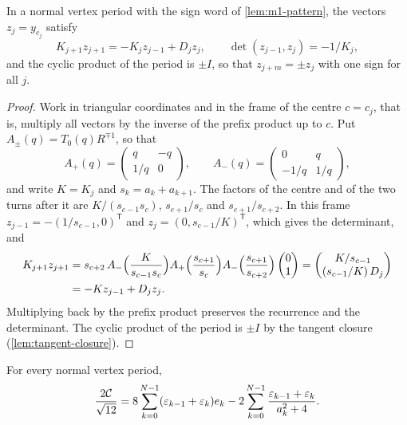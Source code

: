 \begin{lemma}\label{lem:m1-recurrence}
  In a normal vertex period with the sign word of \cref{lem:m1-pattern}, the vectors $z_j=y_{c_j}$
  satisfy
  \[
    K_{j+1}z_{j+1}=-K_jz_{j-1}+D_jz_j,\qquad \det(z_{j-1},z_j)=-1/K_j,
  \]
  and the cyclic product of the period is $\pm I$, so that $z_{j+m}=\pm z_j$ with one sign for all
  $j$.
\end{lemma}

\begin{proof}
  Work in triangular coordinates and in the frame of the centre $c=c_j$, that is, multiply all
  vectors by the inverse of the prefix product up to $c$. Put $A_\pm(q)=T_0(q)R^{\mp1}$, so that
  \[
    A_+(q)=\begin{pmatrix}q&-q\\ 1/q&0\end{pmatrix},\qquad
    A_-(q)=\begin{pmatrix}0&q\\ -1/q&1/q\end{pmatrix},
  \]
  and write $K=K_j$ and $s_k=a_k+a_{k+1}$. The factors of the centre and of the two turns after it
  are $K/(s_{c-1}s_c)$, $s_{c+1}/s_c$ and $s_{c+1}/s_{c+2}$. In this frame
  $z_{j-1}=-(1/s_{c-1},0)^{\mathsf T}$ and $z_j=(0,s_{c-1}/K)^{\mathsf T}$, which gives the
  determinant, and
  \begin{align*}
    K_{j+1}z_{j+1}
    &=s_{c+2}\,A_-\Bigl(\frac K{s_{c-1}s_c}\Bigr)A_+\Bigl(\frac{s_{c+1}}{s_c}\Bigr)
      A_-\Bigl(\frac{s_{c+1}}{s_{c+2}}\Bigr)\begin{pmatrix}0\\1\end{pmatrix}
    =\begin{pmatrix}K/s_{c-1}\\ (s_{c-1}/K)\,D_j\end{pmatrix}\\
    &=-Kz_{j-1}+D_jz_j .
  \end{align*}
  Multiplying back by the prefix product preserves the recurrence and the determinant. The
  cyclic product of the period is $\pm I$ by the tangent closure (\cref{lem:tangent-closure}).
\end{proof}

\begin{lemma}\label{lem:m1-euler}
  For every normal vertex period,
  \[
    \frac{2\mathcal{C}}{\sqrt{12}}
    =8\sum_{k=0}^{N-1}(\varepsilon_{k-1}+\varepsilon_k)e_k
      -2\sum_{k=0}^{N-1}\frac{\varepsilon_{k-1}+\varepsilon_k}{a_k^2+4}.
  \]
\end{lemma}


